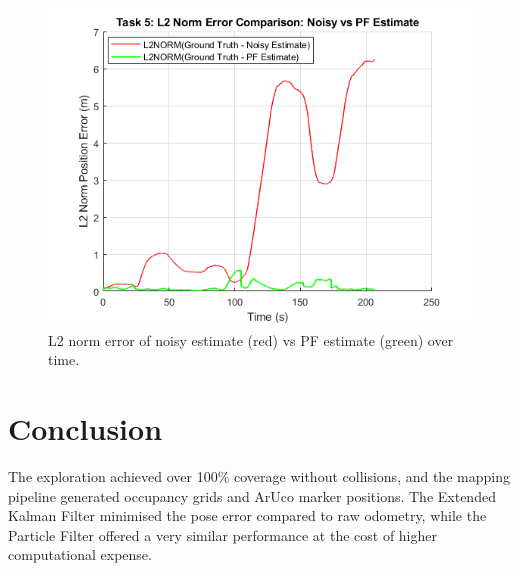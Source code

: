 \documentclass[conference]{IEEEtran}
\begin{document}
\begin{figure}[ht]
  \centering
  \includegraphics[width=\linewidth]{images/Task5_L2NORM_100kp.png}
  \caption{L2 norm error of noisy estimate (red) vs PF estimate (green) over time.}
  \label{fig:task5_l2norm}
\end{figure}

\section{Conclusion}
The exploration achieved over 100\% coverage without collisions, and the mapping pipeline generated occupancy grids and ArUco marker positions. The Extended Kalman Filter minimised the pose error compared to raw odometry, while the Particle Filter offered a very similar performance at the cost of higher computational expense.


\renewcommand{\thesection}{\Alph{section}}
\end{document}
